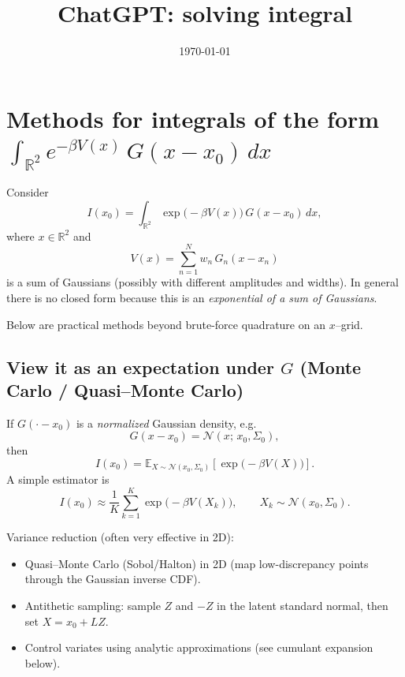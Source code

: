 \documentclass[twocolumn]{notes}
\begin{document}
\title{ChatGPT: solving integral}
\date{\today} %
\maketitle
\tableofcontents
\newpage

\section{Methods for integrals of the form $\int_{\mathbb R^2} e^{-\beta V(x)}\,G(x-x_0)\,dx$}

Consider
\[
I(x_0)=\int_{\mathbb R^2} \exp\!\big(-\beta V(x)\big)\,G(x-x_0)\,dx,
\]
where $x\in\mathbb R^2$ and
\[
V(x)=\sum_{n=1}^N w_n\,G_n(x-x_n)
\]
is a sum of Gaussians (possibly with different amplitudes and widths). In general there is no closed form because this is an \emph{exponential of a sum of Gaussians}.

Below are practical methods beyond brute-force quadrature on an $x$--grid.

\subsection{View it as an expectation under $G$ (Monte Carlo / Quasi--Monte Carlo)}
If $G(\cdot-x_0)$ is a \emph{normalized} Gaussian density, e.g.
\[
G(x-x_0)=\mathcal N(x;\,x_0,\Sigma_0),
\]
then
\[
I(x_0)=\mathbb E_{X\sim \mathcal N(x_0,\Sigma_0)}\!\left[\exp\!\big(-\beta V(X)\big)\right].
\]
A simple estimator is
\[
I(x_0)\approx \frac{1}{K}\sum_{k=1}^K \exp\!\big(-\beta V(X_k)\big),
\qquad X_k\sim \mathcal N(x_0,\Sigma_0).
\]

Variance reduction (often very effective in 2D):
\begin{itemize}
\item Quasi--Monte Carlo (Sobol/Halton) in 2D (map low-discrepancy points through the Gaussian inverse CDF).
\item Antithetic sampling: sample $Z$ and $-Z$ in the latent standard normal, then set $X=x_0+LZ$.
\item Control variates using analytic approximations (see cumulant expansion below).
\end{itemize}
\end{document}
